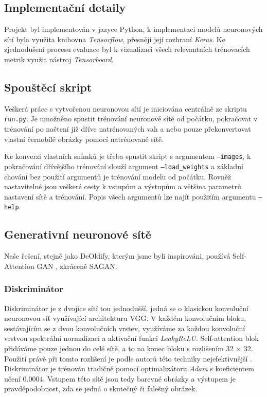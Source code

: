 \documentclass[12pt, a4paper]{article}
\begin{document}
    \subsection{Implementační detaily}
    Projekt byl implementován v jazyce Python, k implementaci modelů neuronových sítí byla využita knihovna \textit{Tensorflow}, přesněji její rozhraní \textit{Keras}. Ke zjednodušení procesu evaluace byl k vizualizaci všech relevantních trénovacích metrik využit nástroj \textit{Tensorboard}.
    
    \subsection{Spouštěcí skript}
    Veškerá práce s vytvořenou neuronovou sítí je iniciována centrálně ze skriptu \texttt{run.py}. Je umožněno spustit trénování neuronové sítě od počátku, pokračovat v trénování po načtení již dříve natrénovaných vah a nebo pouze překonvertovat vlastní černobílé obrázky pomocí natrénované sítě.
    
    Ke konverzi vlastních snímků je třeba spustit skript s argumentem \texttt{--images}, k pokračování dřívějšího trénování slouží argument \texttt{--load\_weights} a základní chování bez použití argumentů je trénování modelu od počátku. Rovněž nastavitelné jsou veškeré cesty k vstupům a výstupům a většina parametrů nastavení sítě a trénování. Popis všech argumentů lze najít použitím argumentu \texttt{--help}.
    
    \subsection{Generativní neuronové sítě}
    Naše řešení, stejně jako DeOldify, kterým jsme byli inspirováni, používá Self-Attention GAN \cite{sagan}, zkráceně SAGAN.
    
    \subsubsection{Diskriminátor}
    Diskriminátor je z dvojice sítí tou jednodušší, jedná se o klasickou konvoluční neuronovou síť využívající architekturu VGG. V každém konvolučním bloku, sestávajícím se z dvou konvolučních vrstev, využíváme za každou konvoluční vrstvou spektrální normalizaci a aktivační funkci \textit{LeakyReLU}. Self-attention blok přidáváme pouze jednou do celé sítě, a to na konec bloku s rozlišením 32 $\times$ 32. Použití právě při tomto rozlišení je podle autorů této techniky nejefektivnější \cite{sagan}. Diskriminátor je trénován tradičně pomocí optimalizátoru \textit{Adam} s koeficientem učení $0.0004$. Vstupem této sítě jsou tedy barevné obrázky a výstupem je pravděpodobnost, zda se jedná o skutečný či falešný obrázek.
    
\end{document}
